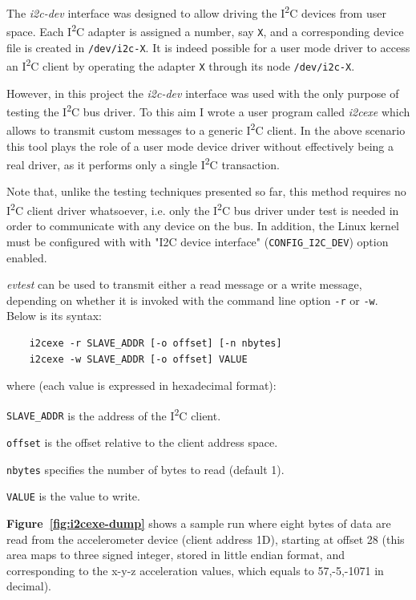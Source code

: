 \documentclass[a4paper,10pt]{article}
\newenvironment{packeddesc}{
\begin{description}
  \setlength{\itemsep}{3pt}
  \setlength{\parskip}{0pt}
  \setlength{\parsep}{0pt}
}{\end{description}}
\newcommand{\iic}{I\textsuperscript{2}C }
\newcommand{\keyword}[1]{\texttt{#1}}
\newcommand{\reff}[1]{\textbf{Figure~\ref{#1}}}
\begin{document}
\begin{multicols}{2}
The \emph{i2c-dev} interface was designed to allow driving the \iic devices from
user space. Each \iic adapter is assigned a number, say \keyword{X}, and a
corresponding device file is created in \keyword{/dev/i2c-X}.
It is indeed possible for a user mode driver to access an \iic client by
operating the adapter \keyword{X} through its node \keyword{/dev/i2c-X}.

However, in this project the \emph{i2c-dev} interface was used with the only
purpose of testing the \iic bus driver. To this aim I wrote a user program
called \emph{i2cexe} which allows to transmit custom messages to a generic \iic
client. In the above scenario this tool plays the role of a user mode device
driver without effectively being a real driver, as it performs only a single
\iic transaction.

Note that, unlike the testing techniques presented so far, this method requires
no \iic client driver whatsoever, i.e. only the \iic bus driver under test is
needed in order to communicate with any device on the bus.
In addition, the Linux kernel must be configured with with "I2C device
interface" (\keyword{CONFIG\_I2C\_DEV}) option enabled.

\emph{evtest} can be used to transmit either a read message or a write message, 
depending on whether it is invoked with the command line option \keyword{-r}
or \keyword{-w}. Below is its syntax:
\begin{verbatim}
	i2cexe -r SLAVE_ADDR [-o offset] [-n nbytes]
	i2cexe -w SLAVE_ADDR [-o offset] VALUE
\end{verbatim}
where (each value is expressed in hexadecimal format):
\begin{packeddesc}
	\item[\keyword{SLAVE\_ADDR}] is the address of the \iic client.
	\item[\keyword{offset}] is the offset relative to the client address space.
	\item[\keyword{nbytes}] specifies the number of bytes to read (default 1).
	\item[\keyword{VALUE}] is the value to write.
\end{packeddesc}

\reff{fig:i2cexe-dump} shows a sample run where eight bytes of data are
read from the accelerometer device (client address 1D), starting at offset 28
(this area maps to three signed integer, stored in little endian format, and
corresponding to the x-y-z acceleration values, which equals to 57,-5,-1071 in 
decimal).


\end{multicols}
\end{document}
